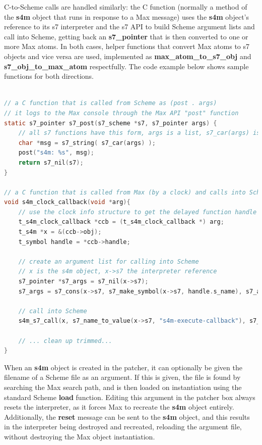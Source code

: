 \documentclass[acmsmall, anonymous, review]{acmart}
\begin{document}
C-to-Scheme calls are handled similarly: the C function (normally a method
of the \textbf{s4m} object that runs in response to a Max message) uses the
\textbf{s4m} object's reference to its s7 interpreter and the s7 API to build
Scheme argument lists and call into Scheme, getting back an \textbf{s7\_pointer} that
is then converted to one or more Max atoms. In both cases, helper
functions that convert Max atoms to s7 objects and vice versa are used, 
implemented as \textbf{max\_atom\_to\_s7\_obj} and \textbf{s7\_obj\_to\_max\_atom}
respectfully. The code example below shows sample functions for both directions.

\begin{lstlisting}[language=C]

// a C function that is called from Scheme as (post . args)
// it logs to the Max console through the Max API "post" function
static s7_pointer s7_post(s7_scheme *s7, s7_pointer args) {
    // all s7 functions have this form, args is a list, s7_car(args) is the first arg, etc 
    char *msg = s7_string( s7_car(args) );
    post("s4m: %s", msg);
    return s7_nil(s7);
}

// a C function that is called from Max (by a clock) and calls into Scheme
void s4m_clock_callback(void *arg){
    // use the clock info structure to get the delayed function handle
    t_s4m_clock_callback *ccb = (t_s4m_clock_callback *) arg;
    t_s4m *x = &(ccb->obj);
    t_symbol handle = *ccb->handle; 
    
    // create an argument list for calling into Scheme
    // x is the s4m object, x->s7 the interpreter reference
    s7_pointer *s7_args = s7_nil(x->s7);
    s7_args = s7_cons(x->s7, s7_make_symbol(x->s7, handle.s_name), s7_args);

    // call into Scheme 
    s4m_s7_call(x, s7_name_to_value(x->s7, "s4m-execute-callback"), s7_args);   
    
    // ... clean up trimmed... 
}

\end{lstlisting}

When an \textbf{s4m} object is created in the patcher, it can optionally be given
the filename of a Scheme file as an argument. If this is given, the
file is found by searching the Max search path, and is then loaded on 
instantiation using the standard Scheme \textbf{load} function.
Editing this argument in the patcher box always resets the
interpreter, as it forces Max to recreate the \textbf{s4m} object entirely. Additionally,
the \textbf{reset} message can be sent to the \textbf{s4m} object, and this results in 
the interpreter being destroyed and recreated, reloading the argument file,
without destroying the Max object instantiation.
\end{document}
